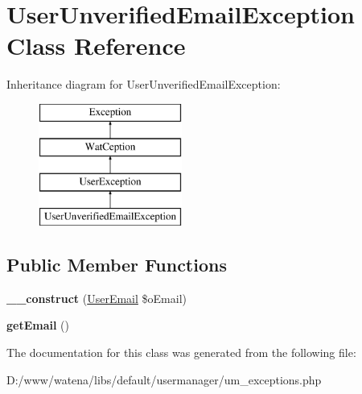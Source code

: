 \hypertarget{class_user_unverified_email_exception}{\section{User\-Unverified\-Email\-Exception Class Reference}
\label{class_user_unverified_email_exception}
}
Inheritance diagram for User\-Unverified\-Email\-Exception\-:\begin{figure}[H]
\begin{center}
\leavevmode
\includegraphics[height=4.000000cm]{class_user_unverified_email_exception}
\end{center}
\end{figure}
\subsection*{Public Member Functions}
\begin{DoxyCompactItemize}
\item 
\hypertarget{class_user_unverified_email_exception_a3784b21e24d4e2e4ca6a248289e18846}{{\bfseries \-\_\-\-\_\-construct} (\hyperlink{class_user_email}{User\-Email} \$o\-Email)}\label{class_user_unverified_email_exception_a3784b21e24d4e2e4ca6a248289e18846}

\item 
\hypertarget{class_user_unverified_email_exception_a20fa58d7a183c26c75a5c7c714846577}{{\bfseries get\-Email} ()}\label{class_user_unverified_email_exception_a20fa58d7a183c26c75a5c7c714846577}

\end{DoxyCompactItemize}


The documentation for this class was generated from the following file\-:\begin{DoxyCompactItemize}
\item 
D\-:/www/watena/libs/default/usermanager/um\-\_\-exceptions.\-php\end{DoxyCompactItemize}
